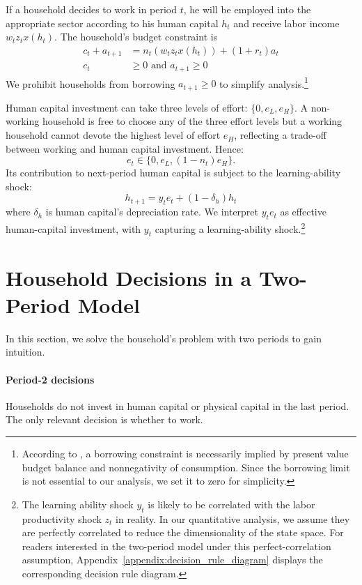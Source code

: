 \documentclass[12pt]{article}
\begin{document}
If a household decides to work in period $t$, he will be employed into the appropriate sector according to his human capital $h_t$ and receive labor income $w_tz_tx(h_t)$. The household's budget constraint is
\begin{align}
    c_t+a_{t+1}&=n_t( w_tz_tx(h_t))+(1+r_t)a_t \\
    c_t& \geq 0 \text{ and } a_{t+1} \geq 0
\end{align}
We prohibit households from borrowing $a_{t+1} \geq 0$ to simplify analysis.\footnote{According to \citet{aiyagari_uninsured_1994}, a borrowing constraint is necessarily implied by present value budget balance and nonnegativity of consumption. Since the borrowing limit is not essential to our analysis, we set it to zero for simplicity.} 

Human capital investment can take three levels of effort: $\{0,e_L,e_H\}$. A non-working household is free to choose any of the three effort levels but a working household cannot devote the highest level of effort $e_H$, reflecting a trade-off between working and human capital investment. Hence:
\begin{equation}
e_t \in \{0, e_L, (1-n_t)e_H\}.
\end{equation}
Its contribution to next-period human capital is subject to the learning-ability shock:
\begin{equation}
h_{t+1}=y_te_t + (1-\delta_h)h_t
\end{equation}
where $\delta_h$ is human capital's depreciation rate. We interpret $y_t e_t$ as effective human-capital investment, with $y_t$ capturing a learning-ability shock.\footnote{The learning ability shock $y_t$ is likely to be correlated with the labor productivity shock $z_t$ in reality. In our quantitative analysis, we assume they are perfectly correlated to reduce the dimensionality of the state space. For readers interested in the two-period model under this perfect-correlation assumption, Appendix~\ref{appendix:decision_rule_diagram} displays the corresponding decision rule diagram.}

 
\section{Household Decisions in a Two-Period Model}
In this section, we solve the household's problem with two periods to gain intuition. 


\paragraph{Period-2 decisions}\label{sec:period2}
Households do not invest in human capital or physical capital in the last period. The only relevant decision is whether to work. 
\end{document}
